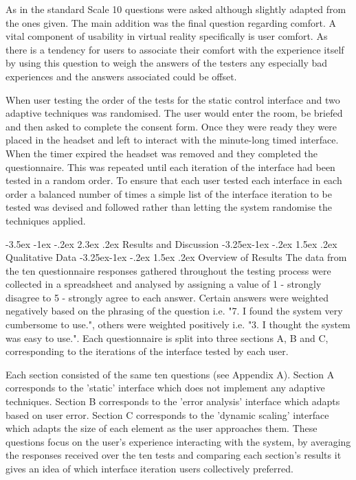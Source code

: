 \documentclass[12pt]{article}
\makeatletter
\renewcommand{\section}{\@startsection {section}{1}{\z@}%
             {-3.5ex \@plus -1ex \@minus -.2ex}%
             {2.3ex \@plus .2ex}%
             {\normalfont\Large\scshape\bfseries}}
\renewcommand{\subsection}{\@startsection{subsection}{2}{\z@}%
             {-3.25ex\@plus -1ex \@minus -.2ex}%
             {1.5ex \@plus .2ex}%
             {\normalfont\large\scshape\bfseries}}
\renewcommand{\subsubsection}{\@startsection{subsubsection}{2}{\z@}%
             {-3.25ex\@plus -1ex \@minus -.2ex}%
             {1.5ex \@plus .2ex}%
             {\normalfont\normalsize\scshape\bfseries}}
\makeatother
\begin{document}
As in the standard Scale 10 questions were asked although slightly adapted from the ones given. The main addition was the final question regarding comfort. A vital component of usability in virtual reality specifically is user comfort. As there is a tendency for users to associate their comfort with the experience itself by using this question to weigh the answers of the testers any especially bad experiences and the answers associated could be offset.

When user testing the order of the tests for the static control interface and two adaptive techniques was randomised. The user would enter the room, be briefed and then asked to complete the consent form. Once they were ready they were placed in the headset and left to interact with the minute-long timed interface. When the timer expired the headset was removed and they completed the questionnaire. This was repeated until each iteration of the interface had been tested in a random order. To ensure that each user tested each interface in each order a balanced number of times a simple list of the interface iteration to be tested was devised and followed rather than letting the system randomise the techniques applied.

\section{Results and Discussion}
\subsection{Qualitative Data}
\subsubsection{Overview of Results}
The data from the ten questionnaire responses gathered throughout the testing process were collected in a spreadsheet and analysed by assigning a value of 1 - strongly disagree to 5 - strongly agree to each answer. Certain answers were weighted negatively based on the phrasing of the question i.e. "7. I found the system very cumbersome to use.", others were weighted positively i.e. "3. I thought the system was easy to use.". Each questionnaire is split into three sections A, B and C, corresponding to the iterations of the interface tested by each user. 

Each section consisted of the same ten questions (see Appendix A). Section A corresponds to the 'static' interface which does not implement any adaptive techniques. Section B corresponds to the 'error analysis' interface which adapts based on user error. Section C corresponds to the 'dynamic scaling' interface which adapts the size of each element as the user approaches them. These questions focus on the user's experience interacting with the system, by averaging the responses received over the ten tests and comparing each section's results it gives an idea of which interface iteration users collectively preferred.
\end{document}
